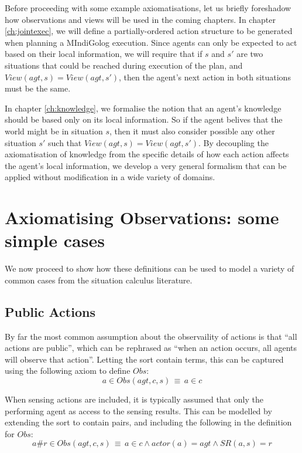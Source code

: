 Before proceeding with some example axiomatisations, let us briefly
foreshadow how observations and views will be used in the coming chapters.
In chapter \ref{ch:jointexec}, we will define a partially-ordered
action structure to be generated when planning a MIndiGolog execution.
Since agents can only be expected to act based on their local information,
we will require that if $s$ and $s'$ are two situations that could
be reached during execution of the plan, and $View(agt,s)=View(agt,s')$,
then the agent's next action in both situations must be the same.

In chapter \ref{ch:knowledge}, we formalise the notion that an agent's
knowledge should be based only on its local information. So if the
agent belives that the world might be in situation $s$, then it must
also consider possible any other situation $s'$ such that $View(agt,s)=View(agt,s')$.
By decoupling the axiomatisation of knowledge from the specific details
of how each action affects the agent's local information, we develop
a very general formalism that can be applied without modification
in a wide variety of domains.


\section{Axiomatising Observations: some simple cases}

We now proceed to show how these definitions can be used to model
a variety of common cases from the situation calculus literature.


\subsection{Public Actions}

By far the most common assumption about the observaility of actions
is that {}``all actions are public'', which can be rephrased as
{}``when an action occurs, all agents will observe that action''.
Letting the sort contain terms,
this can be captured using the following axiom to define $Obs$:\[
a\in Obs(agt,c,s)\,\equiv\, a\in c\]


When sensing actions are included, it is typically assumed that only
the performing agent as access to the sensing results. This can be
modelled by extending the  sort to contain 
pairs, and including the following in the definition for $Obs$:\[
a\#r\in Obs(agt,c,s)\,\equiv\, a\in c\wedge actor(a)=agt\wedge SR(a,s)=r\]


